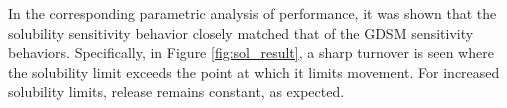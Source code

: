 In the corresponding parametric analysis of \Cyder performance, it was shown that the
solubility sensitivity behavior closely matched that of the \gls{GDSM}
sensitivity behaviors. Specifically, in Figure \ref{fig:sol_result}, a sharp turnover
is seen where the solubility limit exceeds the point at which it limits
movement. For increased solubility limits, release remains constant, as
expected.


